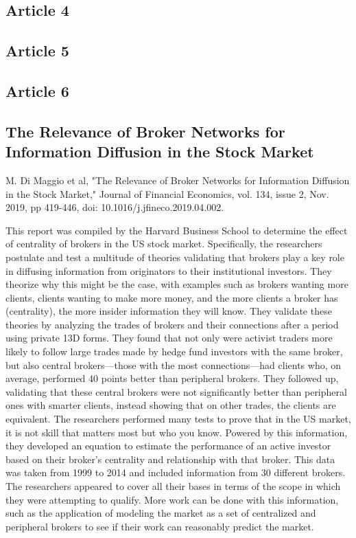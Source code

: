 \documentclass[12pt]{article}
\begin{document}
\subsection{Article 4}

\subsection{Article 5}

\subsection{Article 6}

\subsection{The Relevance of Broker Networks for Information Diffusion in the Stock Market}
M. Di Maggio et al, "The Relevance of Broker Networks for Information Diffusion in the Stock Market," Journal of Financial Economics, vol. 134, issue 2, Nov. 2019, pp 419-446, doi: 10.1016/j.jfineco.2019.04.002.

This report was compiled by the Harvard Business School to determine the effect of centrality of brokers in the US stock market. Specifically, the researchers postulate and test a multitude of theories validating that brokers play a key role in diffusing information from originators to their institutional investors. They theorize why this might be the case, with examples such as brokers wanting more clients, clients wanting to make more money, and the more clients a broker has (centrality), the more insider information they will know. They validate these theories by analyzing the trades of brokers and their connections after a period using private 13D forms. They found that not only were activist traders more likely to follow large trades made by hedge fund investors with the same broker, but also central brokers—those with the most connections—had clients who, on average, performed 40 points better than peripheral brokers. They followed up, validating that these central brokers were not significantly better than peripheral ones with smarter clients, instead showing that on other trades, the clients are equivalent. The researchers performed many tests to prove that in the US market, it is not skill that matters most but who you know. Powered by this information, they developed an equation to estimate the performance of an active investor based on their broker’s centrality and relationship with that broker. This data was taken from 1999 to 2014 and included information from 30 different brokers. The researchers appeared to cover all their bases in terms of the scope in which they were attempting to qualify. More work can be done with this information, such as the application of modeling the market as a set of centralized and peripheral brokers to see if their work can reasonably predict the market.
\end{document}
